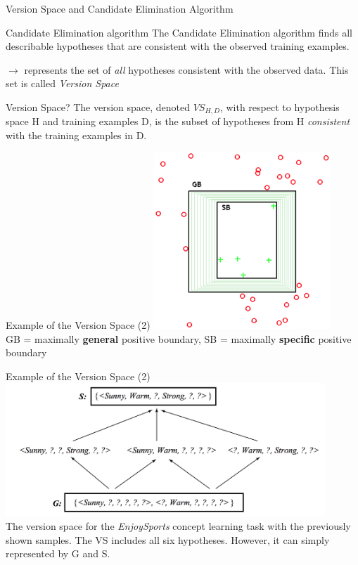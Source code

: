 \documentclass{beamer}
\begin{document}
\begin{frame}{Version Space and Candidate Elimination Algorithm}
\begin{block}{Candidate Elimination algorithm}
The Candidate Elimination algorithm finds all describable hypotheses that are consistent with the observed training examples.
\end{block}
$\rightarrow$ represents the set of \emph{all} hypotheses consistent with the observed data. This set is called \emph{Version Space}

\begin{block}{Version Space?}
The version space, denoted $VS_{H,D}$, with respect to hypothesis space H and training examples D, is the subset of hypotheses from H \emph{consistent} with the training examples in D.
\end{block}
\cite{russel2003,mitchell1997a}
\end{frame}



\begin{frame}{Example of the Version Space (2)}
\centering
\includegraphics[width=0.5\textwidth]{version_space}
\\GB = maximally \textbf{general} positive boundary, SB = maximally \textbf{specific} positive boundary %
\cite{Dfass2006}
\end{frame}


\begin{frame}{Example of the Version Space (2)}
\centering
\includegraphics[width=0.9\textwidth]{version_space_1}
\\The version space for the \emph{EnjoySports} concept learning task with the previously shown samples. The VS includes all six hypotheses. However, it can simply represented by G and S.
\end{frame}
\end{document}
